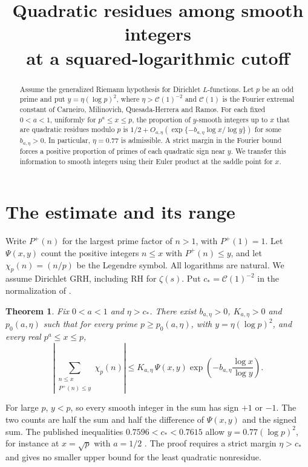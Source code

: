 \documentclass[11pt]{article}
\title{Quadratic residues among smooth integers\\at a squared-logarithmic cutoff}
\author{}
\date{}
\newcommand{\ch}{\chi_p}
\newcommand{\cstar}{c_*}
\newtheorem{theorem}{Theorem}
\begin{document}
\maketitle
\begin{abstract}
Assume the generalized Riemann hypothesis for Dirichlet \(L\)-functions.
Let \(p\) be an odd prime and put \(y=\eta(\log p)^2\), where
\(\eta>\mathcal C(1)^{-2}\) and \(\mathcal C(1)\) is the Fourier extremal
constant of Carneiro, Milinovich, Quesada-Herrera and Ramos. For each fixed
\(0<a<1\), uniformly for \(p^a\le x\le p\), the proportion of \(y\)-smooth
integers up to \(x\) that are quadratic residues modulo \(p\) is
\(1/2+O_{a,\eta}(\exp\{-b_{a,\eta}\log x/\log y\})\) for some
\(b_{a,\eta}>0\). In particular, \(\eta=0.77\) is admissible. A strict
margin in the Fourier bound forces a positive proportion of primes of
each quadratic sign near \(y\). We transfer this information to smooth
integers using their Euler product at the saddle point for \(x\).
\end{abstract}

\section{The estimate and its range}
Write \(P^+(n)\) for the largest prime factor of \(n>1\), with
\(P^+(1)=1\). Let \(\Psi(x,y)\) count the positive integers \(n\le x\)
with \(P^+(n)\le y\), and let \(\ch(n)=(n/p)\) be the Legendre symbol.
All logarithms are natural. We assume Dirichlet GRH, including RH for
\(\zeta(s)\). Put \(\cstar=\mathcal C(1)^{-2}\) in the normalization of
\cite[(1.1)]{cmqr}.

\begin{theorem}\label{th:main}
Fix \(0<a<1\) and \(\eta>\cstar\). There exist \(b_{a,\eta}>0\),
\(K_{a,\eta}>0\) and \(p_0(a,\eta)\) such that for every prime
\(p\ge p_0(a,\eta)\), with \(y=\eta(\log p)^2\), and every real
\(p^a\le x\le p\),
\begin{equation}\label{eq:main}
 \left|\sum_{\substack{n\le x\\P^+(n)\le y}}\ch(n)\right|
 \le K_{a,\eta}\,\Psi(x,y)
       \exp\!\left(-b_{a,\eta}\frac{\log x}{\log y}\right).
\end{equation}
\end{theorem}
For large \(p\), \(y<p\), so every smooth integer in the sum has sign
\(+1\) or \(-1\). The two counts are half the sum and half the difference
of \(\Psi(x,y)\) and the signed sum. The published inequalities
\(0.7596<\cstar<0.7615\) allow \(y=0.77(\log p)^2\), for instance at
\(x=\sqrt p\) with \(a=1/2\) \cite[Theorems 1 and 5]{cmqr}.
The proof requires a strict margin \(\eta>\cstar\) and gives no smaller
upper bound for the least quadratic nonresidue.
\end{document}
